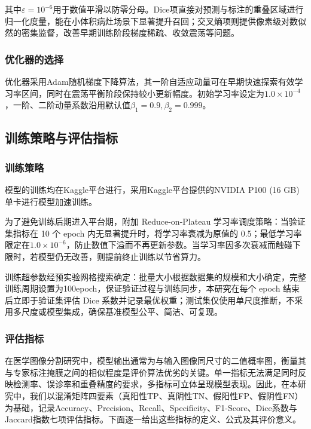 其中$ \varepsilon=10^{-6} $用于数值平滑以防零分母。Dice项直接对预测与标注的重叠区域进行归一化度量，能在小体积病灶场景下显著提升召回；交叉熵项则提供像素级对数似然的密集监督，改善早期训练阶段梯度稀疏、收敛震荡等问题。

\subsubsection{优化器的选择}

优化器采用Adam随机梯度下降算法，其一阶自适应动量可在早期快速探索有效学习率区间，同时在震荡平衡阶段保持较小更新幅度。初始学习率设定为$ 1.0 \times 10^{-4} $，一阶、二阶动量系数沿用默认值$ \beta_{1}=0.9, \beta_{2}=0.999 $。

\subsection{训练策略与评估指标}

\subsubsection{训练策略}

模型的训练均在Kaggle平台进行，采用Kaggle平台提供的NVIDIA P100 (16 GB) 单卡进行模型加速训练。

为了避免训练后期进入平台期，附加 Reduce-on-Plateau 学习率调度策略：当验证集指标在 10 个 epoch 内无显著提升时，将学习率衰减为原值的 0.5；最低学习率限定在$ 1.0 \times 10^{-6} $，防止数值下溢而不再更新参数。当学习率因多次衰减而触碰下限时，若模型仍无改善，则提前终止训练以节省算力。

训练超参数经预实验网格搜索确定：批量大小根据数据集的规模和大小确定，完整训练周期设置为100epoch，保证验证过程与训练同步，本研究在每个 epoch 结束后立即于验证集评估 Dice 系数并记录最优权重；测试集仅使用单尺度推断，不采用多尺度或模型集成，确保基准模型公平、简洁、可复现。

\subsubsection{评估指标}

在医学图像分割研究中，模型输出通常为与输入图像同尺寸的二值概率图，衡量其与专家标注掩膜之间的相似程度是评价算法优劣的关键。单一指标无法满足同时反映检测率、误诊率和重叠精度的要求，多指标可立体呈现模型表现。因此，在本研究中，我们以混淆矩阵四要素（真阳性TP、真阴性TN、假阳性FP、假阴性FN）为基础，记录Accuracy、Precision、Recall、Specificity、F1-Score、Dice系数与Jaccard指数七项评估指标。下面逐一给出这些指标的定义、公式及其评价意义。

